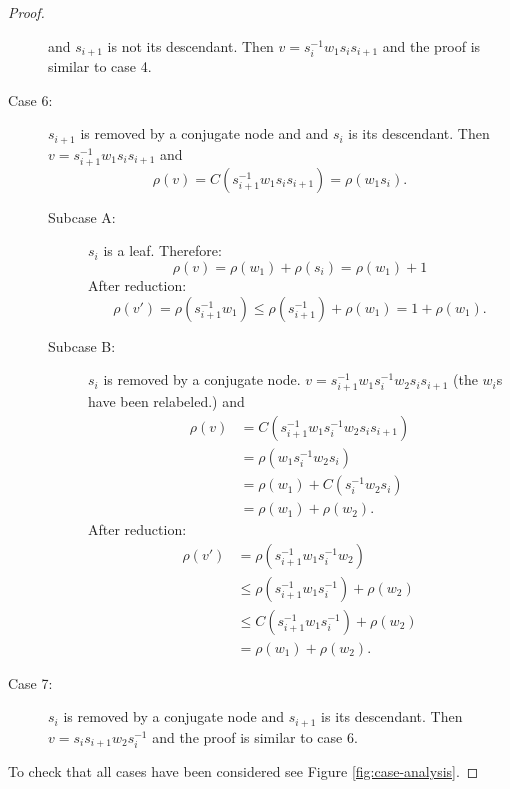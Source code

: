 \documentclass[12pt]{thesis}
\begin{document}
\begin{proof}
\begin{description}
           and $s_{i+1}$ is not its descendant.
           Then $v = s_{i}^{-1} w_{1} s_{i} s_{i+1}$ and
           the proof is similar to case 4.
     \item [Case 6:]
       $s_{i+1}$ is removed by a conjugate
        node and
        and $s_{i}$ is its descendant.
        Then $v = s_{i+1}^{-1} w_{1} s_{i} s_{i+1}$
        and 
        \[
            \rho(v) = C(s_{i+1}^{-1} w_{1} s_{i} s_{i+1}) = \rho(w_{1} s_{i}).
        \]
        \begin{description}
            \item[Subcase A:]
                 $s_{i}$ is a leaf.
                 Therefore:
                    \[
                        \rho(v) = \rho(w_{1}) + \rho(s_{i})
                               = \rho(w_{1}) + 1
                    \]
                    After reduction:
                    \[
                        \rho(v') = \rho(s_{i+1}^{-1}w_{1})
                               \leq \rho(s_{i+1}^{-1}) + \rho(w_{1})
                              = 1 + \rho(w_{1}).
                    \]
             \item[Subcase B:]
             $s_{i}$ is removed by a conjugate node.
                $v = s_{i+1}^{-1} w_{1} s_{i}^{-1} w_{2} s_{i} s_{i+1}$ (the $w_{i}$s have been relabeled.)
                and
                \[
                 \begin{split}
                     \rho(v) &= C(s_{i+1}^{-1} w_{1} s_{i}^{-1} w_{2} s_{i} s_{i+1})  \\
                     &= \rho(w_{1} s_{i}^{-1} w_{2} s_{i})  \\
                     &= \rho(w_{1}) + C(s_{i}^{-1} w_{2} s_{i}) \\
                     &= \rho(w_{1}) + \rho(w_{2}).
                 \end{split}
                \]
                After reduction:
                \[
                \begin{split}
                    \rho(v') &= \rho(s_{i + 1}^{-1} w_{1} s_{i}^{-1}w_{2}) \\
                    &\leq  \rho(s_{i + 1}^{-1} w_{1} s_{i}^{-1}) + \rho(w_{2}) \\
                    &\leq C(s_{i + 1}^{-1} w_{1} s_{i}^{-1}) + \rho(w_{2}) \\
                    &= \rho(w_{1}) + \rho(w_{2}).
                \end{split}
                \]
            \end{description}
     \item [Case 7:]
         $s_{i}$ is removed by a conjugate node and
         $s_{i+1}$ is its descendant.
         Then $v = s_{i}s_{i+1} w_{2} s_{i}^{-1}$
         and the proof is similar to  case 6. \qedhere
\end{description}
To check that all cases have been considered see Figure \ref{fig:case-analysis}.
\end{proof}
\end{document}
